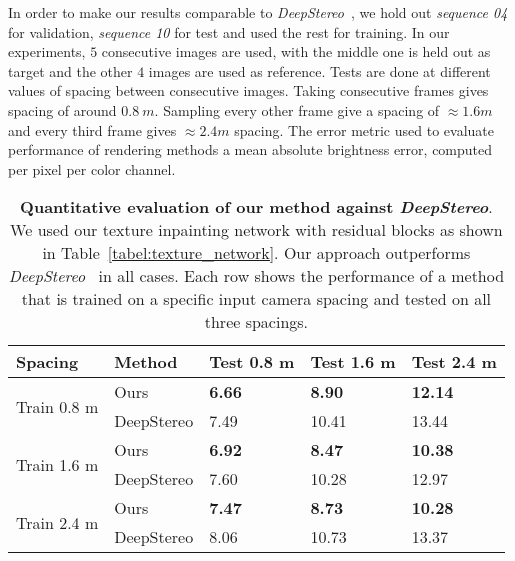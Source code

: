 \documentclass[runningheads]{llncs}
\newcommand{\squeezeup}{\vspace{-5.5mm}}
\begin{document}
In order to make our results comparable to \textit{DeepStereo}~\cite{flynn2015deepstereo}, we hold out \textit{sequence 04} for validation, \textit{sequence 10} for test and used the rest for training. In our experiments, $5$ consecutive images are used, with the middle one is held out as target and the other $4$ images are used as reference. Tests are done at different values of spacing between consecutive images. Taking consecutive frames gives spacing of around $ 0.8~m$. Sampling every other frame give a spacing of $\approx1.6 m$ and every third frame gives $\approx2.4 m$ spacing. The error metric used to evaluate performance of rendering methods a mean absolute brightness error, computed per pixel per color channel. 
\begin{table}[htb!]
\centering
\begin{tabular}{|l|l|l|l|l|}
\hline
Spacing & Method                  & Test 0.8 m       & Test 1.6 m      & Test 2.4 m       \\ \hline
\multirow{2}{*}{Train 0.8 m }  & Ours       & \textbf{6.66} & \textbf{8.90} & \textbf{12.14}  \\ \cline{2-5} 
                           & DeepStereo & 7.49          & 10.41         & 13.44          \\ \hline
\multirow{2}{*}{Train 1.6 m} & Ours       & \textbf{6.92} & \textbf{8.47} & \textbf{10.38} \\ \cline{2-5} 
                           & DeepStereo & 7.60           & 10.28         & 12.97          \\ \hline
\multirow{2}{*}{Train 2.4 m} & Ours       & \textbf{7.47} & \textbf{8.73} & \textbf{10.28} \\ \cline{2-5} 
                           & DeepStereo & 8.06          & 10.73         & 13.37          \\ \hline
\end{tabular}
\caption{\textbf{Quantitative evaluation of our method against \textit{DeepStereo}}. We used our texture inpainting network with residual blocks as shown in Table~\ref{tabel:texture_network}. Our approach outperforms \textit{DeepStereo}~\cite{flynn2015deepstereo} in all cases. Each row shows the performance of a method that is trained on a specific input camera spacing and tested on all three spacings.}
\label{table:mainresult}

\end{table}
\squeezeup
\squeezeup
\end{document}
